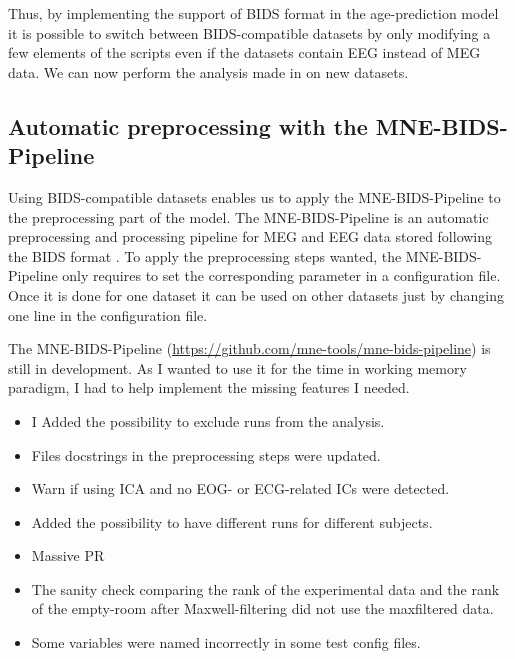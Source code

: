 Thus, by implementing the support of BIDS format in the age-prediction model it is possible to switch between BIDS-compatible datasets by only modifying a few elements of the scripts even
if the datasets contain EEG instead of MEG data. We can now perform the analysis made in
\cite{herbst2021abstracting} on new datasets.


\subsection{Automatic preprocessing with the MNE-BIDS-Pipeline}

Using BIDS-compatible datasets enables us to apply the MNE-BIDS-Pipeline to the preprocessing part of the model. The MNE-BIDS-Pipeline is an automatic preprocessing and processing pipeline for MEG and EEG data stored following the BIDS format \cite{gorgolewski2016brain}. To apply the preprocessing steps wanted, the MNE-BIDS-Pipeline only requires to set the corresponding parameter in a configuration file. Once it is done for one dataset it can be used on other datasets just by changing one line in the configuration file.

The MNE-BIDS-Pipeline (\url{https://github.com/mne-tools/mne-bids-pipeline}) is still in development. As I wanted to use it for the time in working memory paradigm, I had to help implement the missing features I needed.

\begin{itemize}
    \item I Added the possibility to exclude runs from the analysis.
    \item Files docstrings in the preprocessing steps were updated.
    \item Warn if using ICA and no EOG- or ECG-related ICs were detected.
    \item Added the possibility to have different runs for different subjects.
    \item Massive PR
    \item The sanity check comparing the rank of the experimental data and the rank of the empty-room after Maxwell-filtering did not use the maxfiltered data.
    \item Some variables were named incorrectly in some test config files.
\end{itemize}

